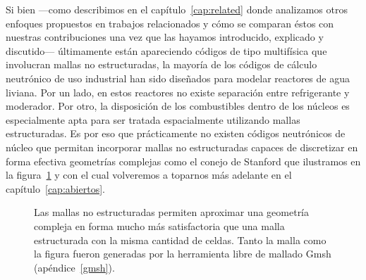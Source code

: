 Si bien ---como describimos en el capítulo~\ref{cap:related} donde analizamos otros enfoques propuestos en trabajos relacionados y cómo se comparan éstos con nuestras contribuciones una vez que las hayamos introducido, explicado y discutido--- últimamente están apareciendo códigos de tipo multifísica que involucran mallas no estructuradas, la mayoría de los códigos de cálculo neutrónico de uso industrial han sido diseñados para modelar reactores de agua liviana. Por un lado, en estos reactores no existe  separación entre refrigerante y moderador. Por otro, la disposición de los combustibles dentro de los núcleos es especialmente apta para ser tratada espacialmente utilizando mallas estructuradas. Es por eso que prácticamente no existen códigos neutrónicos de núcleo que permitan incorporar mallas no estructuradas capaces de discretizar en forma efectiva geometrías complejas como el conejo de Stanford que ilustramos en la figura~\ref{fig:bunny-meshed} y con el cual volveremos a toparnos más adelante en el capítulo~\ref{cap:abiertos}.



\begin{figure}[t]
 \begin{center}
   \hspace{1cm plus 0.5cm minus 0.5cm}
 \end{center}
\caption{\label{fig:bunny-meshed}Las mallas no estructuradas permiten aproximar una geometría compleja en forma mucho más satisfactoria que una malla estructurada con la misma cantidad de celdas. Tanto la malla como la figura fueron generadas por la herramienta libre de mallado Gmsh (apéndice~\ref{gmsh}).}
\end{figure}


